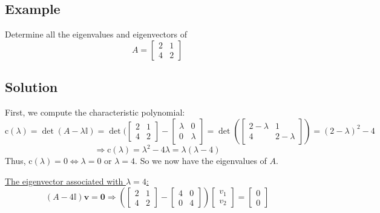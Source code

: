 \documentclass[11pt]{article}
\newcommand{\ident}{\mathbb{I}}
\renewcommand{\vec}[1]{\mathbf{#1}}
\begin{document}
\subsection{Example}
Determine all the eigenvalues and eigenvectors of
\[ A = \begin{bmatrix}
2 & 1 \\
4 & 2
\end{bmatrix} \]

\subsection{Solution}
First, we compute the characteristic polynomial:
\[ 
\text{c}(\lambda) = \det(A - \lambda \ident) 
= \det(\begin{bmatrix}
2 & 1 \\
4 & 2
\end{bmatrix}
- \begin{bmatrix}
\lambda & 0 \\
0 & \lambda
\end{bmatrix} 
= \det(\begin{bmatrix}
2 - \lambda & 1 \\
4 & 2 - \lambda
\end{bmatrix})
= (2 - \lambda)^2 - 4
\]
\[
\Rightarrow \text{c}(\lambda) = \lambda^2 - 4\lambda = \lambda (\lambda - 4)
\]
Thus, $\text{c}(\lambda) = 0 \Leftrightarrow \lambda = 0 \text{ or } \lambda = 4$. So we now have the eigenvalues of $A$.

\underline{The eigenvector associated with $\lambda = 4$:}
\[ (A - 4 \ident) \vec{v} = \vec{0} \Rightarrow \left( \begin{bmatrix}
2 & 1\\
4 & 2
\end{bmatrix} 
- \begin{bmatrix}
4 & 0 \\
0 & 4
\end{bmatrix} \right)
\begin{bmatrix}
v_1 \\
v_2
\end{bmatrix}
= \begin{bmatrix}
0 \\
0
\end{bmatrix}
\]
\end{document}
